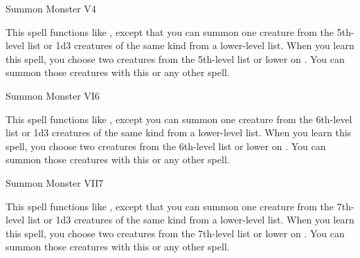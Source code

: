 \begin{spellsection}{Summon Monster V}{4}
\begin{spellheader}
\end{spellheader}
\begin{spellcontent}
    \spelleffect This spell functions like , except that you can summon one creature from the 5th-level list or 1d3 creatures of the same kind from a lower-level list. When you learn this spell, you choose two creatures from the 5th-level list or lower on . You can summon those creatures with this or any other  spell.
    \spelldur \durshort \dismissable
\end{spellcontent}
\begin{spellfooter}
\end{spellfooter}
\end{spellsection}

\begin{spellsection}{Summon Monster VI}{6}
\begin{spellheader}
\end{spellheader}
\begin{spellcontent}
    \spelleffect This spell functions like , except you can summon one creature from the 6th-level list or 1d3 creatures of the same kind from a lower-level list. When you learn this spell, you choose two creatures from the 6th-level list or lower on . You can summon those creatures with this or any other  spell.
    \spelldur \durshort \dismissable
\end{spellcontent}
\begin{spellfooter}
\end{spellfooter}
\end{spellsection}

\begin{spellsection}{Summon Monster VII}{7}
\begin{spellheader}
\end{spellheader}
\begin{spellcontent}
    \spelleffect This spell functions like , except that you can summon one creature from the 7th-level list or 1d3 creatures of the same kind from a lower-level list. When you learn this spell, you choose two creatures from the 7th-level list or lower on . You can summon those creatures with this or any other  spell.
    \spelldur \durshort \dismissable
\end{spellcontent}
\begin{spellfooter}
\end{spellfooter}
\end{spellsection}


